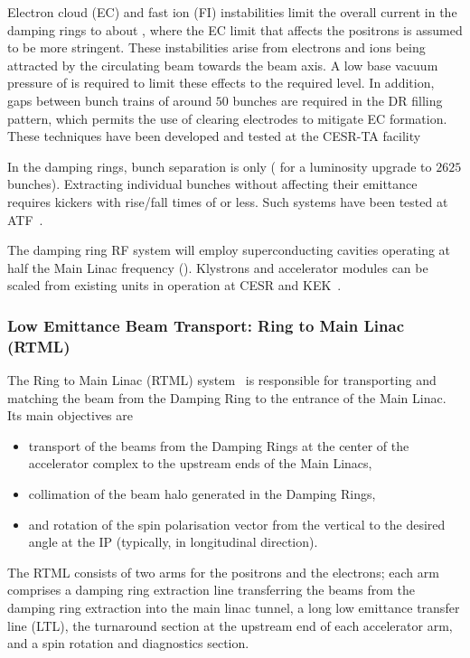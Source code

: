 Electron cloud (EC) and fast ion (FI) instabilities limit the overall current in the damping rings to about , where the EC limit that affects the positrons is assumed to be more stringent. 
These instabilities arise from electrons and ions being attracted by the circulating beam towards the beam axis. 
A low base vacuum pressure of  is required to limit these effects to the required level.
In addition, gaps between bunch trains of around $50$ bunches are required in the DR filling pattern, which permits the use of clearing electrodes to mitigate EC formation.
These techniques have been developed and tested at the CESR-TA facility~\cite{Conway:2012zza}

In the damping rings, bunch separation is only  ( for a luminosity upgrade to $2625$ bunches). 
Extracting individual bunches without affecting their emittance requires kickers with rise/fall times of  or less.
Such systems have been tested at ATF~\cite{Naito:2010zzb}.

The damping ring RF system will employ superconducting cavities operating at half the Main Linac frequency ().
Klystrons and accelerator modules can be scaled from existing  units in operation at CESR and KEK~\cite[Sec. 6.6]{Adolphsen:2013kya}. 


\subsubsection{Low Emittance Beam Transport: Ring to Main Linac (RTML)}
\label{sec:rtml}

The Ring to Main Linac (RTML) system~\cite[Chap. 7]{Adolphsen:2013kya} is responsible for transporting and matching the beam from the Damping Ring to the entrance of the Main Linac.
Its main objectives are
\begin{itemize} 
\item transport of the beams from the Damping Rings at the center of the accelerator complex to the upstream ends of the Main Linacs,
\item collimation of the beam halo generated in the Damping Rings,
\item and rotation of the spin polarisation vector from the vertical to the desired angle at the IP (typically, in longitudinal direction).
\end{itemize}

The RTML consists of two arms for the positrons and the electrons; 
each arm comprises a damping ring extraction line transferring the beams from the damping ring extraction into the main linac tunnel, a long low emittance transfer line (LTL), the turnaround section at the upstream end of each accelerator arm, and a spin rotation and diagnostics section.

